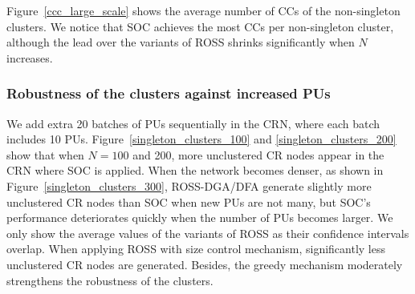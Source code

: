 \documentclass[10pt,journal,compsoc]{IEEEtran}
\theoremstyle{mytheoremstyle}
\theoremstyle{mytheoremstyle}
\theoremstyle{mytheoremstyle}
\newcommand{\ie}{i.e., }
\begin{document}
Figure~\ref{ccc_large_scale} shows the average number of CCs of the non-singleton clusters.
We notice that SOC achieves the most CCs per non-singleton cluster, although the lead over the variants of ROSS shrinks significantly when $N$ increases.




\subsubsection{Robustness of the clusters against increased PUs}
We add extra 20 batches of PUs sequentially in the CRN, where each batch includes 10 PUs. 
Figure~\ref{singleton_clusters_100} and \ref{singleton_clusters_200} show that when $N=100$ and 200, more unclustered CR nodes appear in the CRN where SOC is applied.
When the network becomes denser, as shown in Figure~\ref{singleton_clusters_300}, ROSS-DGA/DFA generate slightly more unclustered CR nodes than SOC when new PUs are not many, but SOC's performance deteriorates quickly when the number of PUs becomes larger.
We only show the average values of the variants of ROSS as their confidence intervals overlap.
%
When applying ROSS with size control mechanism, significantly less unclustered CR nodes are generated.
Besides, the greedy mechanism moderately strengthens the robustness of the clusters.
\end{document}
